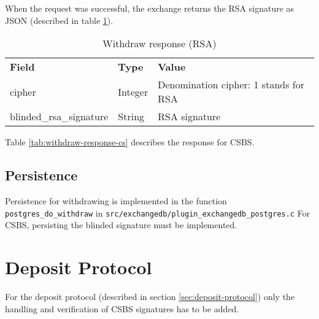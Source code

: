 When the request was successful, the exchange returns the RSA signature as JSON (described in table \ref{tab:withdraw-response-rsa}).
\begin{table}[ht]
  \centering
  \setupBfhTabular
  \begin{tabular}{lll}
      \rowcolor{BFH-tablehead}
      \textbf{Field} & \textbf{Type} & \textbf{Value} \\
      cipher & Integer & Denomination cipher: 1 stands for RSA \\
      blinded\_rsa\_signature & String & RSA signature \\
  \end{tabular}
  \caption{Withdraw response (RSA)}
  \label{tab:withdraw-response-rsa}
\end{table}

Table \ref{tab:withdraw-response-cs} describes the response for \gls{CSBS}.
\begin{table}[ht]
  \centering
\end{table}


\subsection{Persistence}
Persistence for withdrawing is implemented in the function \texttt{postgres\_do\_withdraw} in \texttt{src/exchangedb/plugin\_exchangedb\_postgres.c}
For \gls{CSBS}, persisting the blinded signature must be implemented.


\section{Deposit Protocol}
For the deposit protocol (described in section \ref{sec:deposit-protocol}) only the handling and verification of \gls{CSBS} signatures has to be added.

